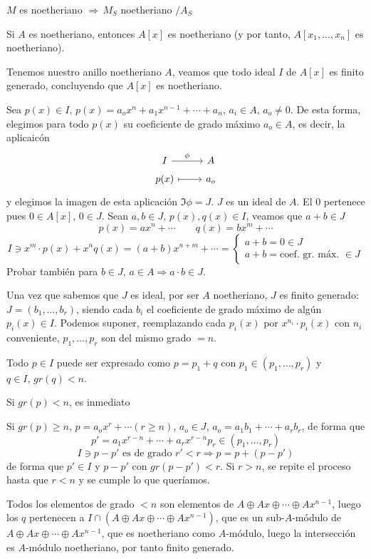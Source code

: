 $M$ es noetheriano $\Rightarrow \, M_S$ noetheriano $/A_S$
\begin{teo}
     Si $A$ es noetheriano, entonces $A[x]$ es noetheriano (y por tanto, $A[x_1, \ldots,x_n]$ es noetheriano). 
\end{teo}
\begin{dem}
    Tenemos nuestro anillo noetheriano $A$, veamos que todo ideal $I$ de $A[x]$ es finito generado, concluyendo que $A[x]$ es noetheriano.

    Sea $p(x) \in I, \, p(x) = a_o x^n + a_1x^{n-1} + \cdots + a_n, \, a_i \in A, \, a_o \neq 0$. De esta forma, elegimos para todo $p(x)$ su coeficiente de grado m\'aximo $a_o\in A$, es decir, la aplicaic\'on
    $$\bt I \rar{\phi} & A \\[-5mm] p(x) \rarmaps & a_o \et$$
    y elegimos la imagen de esta aplicaci\'on $\Im \phi = J$. $J$ es un ideal de $A$. El 0 pertenece pues $0 \in A[x], \, 0 \in J$. Sean $a,b \in J, \, p(x), q(x) \in I$, veamos que $a+b \in J$
    $$p(x) = ax^n + \cdots \qquad q(x) = bx^m + \cdots$$
    $$I \ni x^m \cdot p(x) + x^n q(x) = (a+b) x^{n+m} + \cdots = \begin{cases}
        a+b= 0 \in J \\ a+b = \text{coef. gr. m\'ax. } \in J
    \end{cases}$$
    Probar tambi\'en para $b \in J, \, a\in A\Rightarrow a\cdot b \in J$. 

    Una vez que sabemos que $J$ es ideal, por ser $A$ noetheriano, $J$ es finito generado: $J=(b_1,\ldots, b_r)$, siendo cada $b_i$ el coeficiente de grado m\'aximo de alg\'un $p_i(x) \in I$. Podemos suponer, reemplazando cada $p_i(x)$ por $x^{n_i} \cdot p_i(x)$ con $n_i$ conveniente, $p_1, \ldots, p_r$ son del mismo grado $=n$. 

    Todo $p\in I$ puede ser expresado como $p = p_1+q$ con $p_1 \in (p_1, \ldots, p_r)$ y $q \in I, \, gr(q) < n$. 

    Si $gr(p) < n$, es inmediato

    Si $gr(p) \geq n$, $p=a_o x^r + \cdots (r \geq n)$, $a_o \in J, \, a_o = a_1b_1 + \cdots  + a_r b_r$, de forma que 
    $$p'=a_1 x^{r-n} + \cdots + a_r x^{r-n} p_r \in (p_1, \ldots, p_r)$$
    $$I \ni p-p' \text{ es de grado } r'<r  \Rightarrow p = p+(p-p')$$
    de forma que $p'\in I$ y $p-p'$ con $gr(p-p') < r$. Si $r> n$, se repite el proceso hasta que $r<n$ y se cumple lo que quer\'iamos. 

    Todos los elementos de grado $<n$ son elementos de $A \oplus Ax \oplus \cdots \oplus Ax^{n-1}$, luego los $q$ pertenecen a $I \cap (A \oplus Ax \oplus \cdots \oplus Ax^{n-1})$, que es un sub-$A$-m\'odulo de $A \oplus Ax \oplus \cdots \oplus Ax^{n-1}$, que es noetheriano como $A$-m\'odulo, luego la intersecci\'on es $A$-m\'odulo noetheriano, por tanto finito generado. 
\end{dem}

